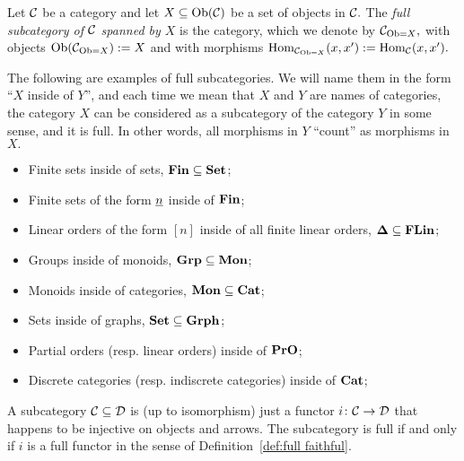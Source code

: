 \documentclass[CT4S-EN-RU]{subfiles}
\begin{document}
\begin{definitionENG}\label{def:full subcategory}
Let $\mathcal{C}$ be a category and let $X\subseteq\textnormal{Ob}(\mathcal{C})$ be a set of objects in $\mathcal{C}.$ The {\em full subcategory of $\mathcal{C}$ spanned by $X$} is the category, which we denote by $\mathcal{C}_{\textnormal{Ob}=X},$ with objects $\textnormal{Ob}(\mathcal{C}_{\textnormal{Ob}=X}):=X$ and with morphisms $\textnormal{Hom}_{\mathcal{C}_{\textnormal{Ob}=X}}(x,x'):=\textnormal{Hom}_\mathcal{C}(x,x').$
\end{definitionENG}

\begin{definitionRUS}\label{def:full subcategory}
\end{definitionRUS}

\begin{exampleENG}
The following are examples of full subcategories. We will name them in the form “$X$ inside of $Y$”, and each time we mean that $X$ and $Y$ are names of categories, the category $X$ can be considered as a subcategory of the category $Y$ in some sense, and it is full. In other words, all morphisms in $Y$ “count” as morphisms in $X.$
\begin{itemize}
\item Finite sets inside of sets, ${\mathbf{Fin}}\subseteq{\mathbf{Set}}$;
\item Finite sets of the form $\underline{n}$ inside of ${\mathbf{Fin}}$;
\item Linear orders of the form $[n]$ inside of all finite linear orders, ${\mathbf{\Delta}}\subseteq{\mathbf{FLin}}$;
\item Groups inside of monoids, ${\mathbf{Grp}}\subseteq{\mathbf{Mon}}$;
\item Monoids inside of categories, ${\mathbf{Mon}}\subseteq{\mathbf{Cat}}$;
\item Sets inside of graphs, ${\mathbf{Set}}\subseteq{\mathbf{Grph}}$;
\item Partial orders (resp. linear orders) inside of ${\mathbf{PrO}}$;
\item Discrete categories (resp. indiscrete categories) inside of ${\mathbf{Cat}}$;
\end{itemize}
\end{exampleENG}

\begin{exampleRUS}
\end{exampleRUS}

\begin{remarkENG}
A subcategory $\mathcal{C}\subseteq\mathcal{D}$ is (up to isomorphism) just a functor $i\colon\mathcal{C}\rightarrow\mathcal{D}$ that happens to be injective on objects and arrows. The subcategory is full if and only if $i$ is a full functor in the sense of Definition~\ref{def:full faithful}.
\end{remarkENG}
\end{document}
